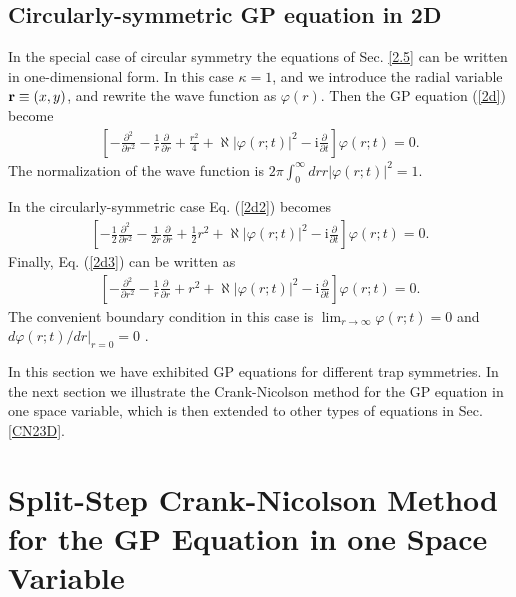 \documentclass[onecolumn]{elsart3p}
\begin{document}
\subsection{Circularly-symmetric GP equation in 2D}



In the special case of circular symmetry the equations of Sec. \ref{2.5}
can be written in one-dimensional form. In this case $\kappa =1$, and
we introduce the radial variable ${\bf r}\equiv (x,y)$, and rewrite the
wave function as $\varphi(r)$. Then the GP equation (\ref{2d}) become
\begin{align}
\left[-\frac{\partial^2}
{\partial r^2}-\frac{1}{r}\frac{\partial}
{\partial r} +\frac{r^2}{4}+\aleph  %
\left| {\varphi(r;t)}
\right| ^2 -
\mbox{i}\frac{\partial }{\partial t}\right] \varphi
(r;t)=0.
\label{cir}
\end{align}
 The normalization of  the
wave function is
$2\pi \int_0^\infty dr r\vert\varphi(r;t)\vert^2=1.$

In the circularly-symmetric case Eq. (\ref{2d2}) becomes
\begin{align}
\left[-\frac{1}{2}\frac{\partial^2}
{\partial r^2}-\frac{1}{2r}\frac{\partial}
{\partial r}+
\frac{1}{2}{r^2}+\aleph  %
\left| {\varphi(r;t)}
\right| ^2 -
\mbox{i}\frac{\partial }{\partial t}\right] \varphi
(r;t)=0.
\label{cir2}
\end{align}
Finally, Eq. (\ref{2d3}) can be written as
\begin{align}
\left[-\frac{\partial^2}
{\partial r^2}-\frac{1}{r}\frac{\partial}
{\partial r}
+{r^2}+\aleph   %
\left| {\varphi(r;t)}
\right| ^2 -
\mbox{i}\frac{\partial }{\partial t}\right] \varphi
(r;t)=0.
\label{cir3}
\end{align}
The convenient boundary condition in this case is $\lim_{r\to \infty }
\varphi
(r;t)=0$ and $d\varphi
(r;t)/dr|_{r=0}=0$ \cite{num4}.


In this section we have exhibited GP equations for different
trap symmetries. In the next section we illustrate the Crank-Nicolson
method for the GP equation in one space variable, which is then
extended to
other types of equations in Sec. \ref{CN23D}.



\section{Split-Step Crank-Nicolson Method for the GP
Equation in one Space Variable}
\label{CN1D}
\end{document}

